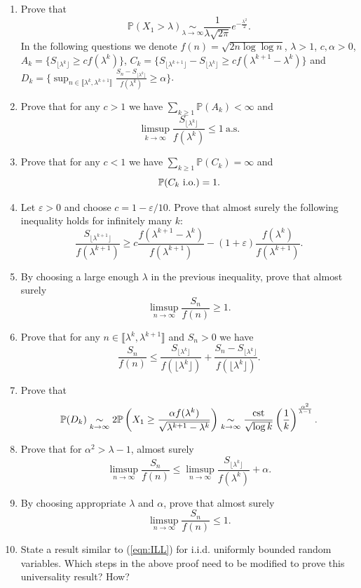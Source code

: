 \documentclass[11pt,reqno]{amsart}
\newcommand{\1}{\mathds{1}}
\theoremstyle{definition}
\theoremstyle{remark}
\numberwithin{equation}{section}
\begin{document}
\begin{enumerate}[(1)]
\item Prove that
$$
\mathbb{P}(X_1>\lambda)\underset{\lambda\to\infty}{\sim}\frac{1}{\lambda\sqrt{2\pi}}e^{-\frac{\lambda^2}{2}}.
$$
In the following questions we denote $f(n)=\sqrt{2n\log\log n}$, $\lambda>1$, $c,\alpha>0$, $A_k=\{S_{\lfloor \lambda^k\rfloor}\geq c f(\lambda^k)\}$, 
$C_k=\{S_{\lfloor \lambda^{k+1}\rfloor}-S_{\lfloor \lambda^{k}\rfloor}\geq c f(\lambda^{k+1}-\lambda^k)\}$ and 
$D_k=\{\sup_{n\in\llbracket\lambda^k,\lambda^{k+1}\rrbracket}\frac{S_{n}-S_{\lfloor \lambda^{k}\rfloor}}{f(\lambda^k)}\geq \alpha\}$. 
\item Prove that for any $c>1$ we have $\sum_{k\geq 1}\mathbb{P}(A_k)<\infty$ and 
$$
\limsup_{k\to\infty}\frac{S_{\lfloor \lambda^k\rfloor}}{f(\lambda^k)}\leq 1\ \mbox{a.s.}
$$ 
\item Prove that for any $c<1$ we have $\sum_{k\geq 1}\mathbb{P}(C_k)=\infty$ and 
$$
\mathbb{P}(C_k\ {\rm i.o.})=1.
$$ 
\item Let $\varepsilon>0$ and choose $c=1-\varepsilon/10$. Prove that almost surely the following inequality holds for infinitely many $k$:
$$
\frac{S_{\lfloor \lambda^{k+1}\rfloor}}{f(\lambda^{k+1})}\geq c \frac{f(\lambda^{k+1}-\lambda^k)}{f(\lambda^{k+1})}-(1+\varepsilon)\frac{f(\lambda^k)}{f(\lambda^{k+1})}.
$$ 
\item By choosing a large enough $\lambda$ in the previous inequality, prove that almost surely 
$$
\limsup_{n\to\infty}\frac{S_n}{f(n)}\geq1.
$$
\item Prove that for any $n\in\llbracket\lambda^k,\lambda^{k+1}\rrbracket$ and $S_n>0$ we have
$$
\frac{S_n}{f(n)}\leq \frac{S_{\lfloor \lambda^k\rfloor}}{f(\lfloor\lambda^k\rfloor)}+
\frac{S_n-S_{\lfloor \lambda^k\rfloor}}{f(\lfloor\lambda^k\rfloor)}.
$$
\item Prove that
$$
\mathbb{P}(D_k)\underset{k\to\infty}{\sim}2\mathbb{P}\left(X_1\geq \frac{\alpha f(\lambda^k)}{\sqrt{\lambda^{k+1}-\lambda^k}}\right)
\underset{k\to\infty}{\sim}
\frac{{\rm cst}}{\sqrt{\log k}}\left(\frac{1}{k}\right)^{\frac{\alpha^2}{\lambda-1}}.
$$
\item Prove that for $\alpha^2>\lambda-1$, almost surely
$$
\limsup_{n\to\infty}\frac{S_n}{f(n)}\leq \limsup_{n\to\infty}\frac{S_{\lfloor\lambda^k\rfloor}}{f(\lambda^k)}+\alpha.
$$
\item  By choosing appropriate $\lambda$ and $\alpha$, prove that
 almost surely 
$$
\limsup_{n\to\infty}\frac{S_n}{f(n)}\leq1.
$$
\item State a result similar to (\ref{eqn:ILL}) for i.i.d. uniformly bounded random variables. Which steps in the above proof need to be modified to prove this universality result? How?
\end{enumerate}
\end{document}

